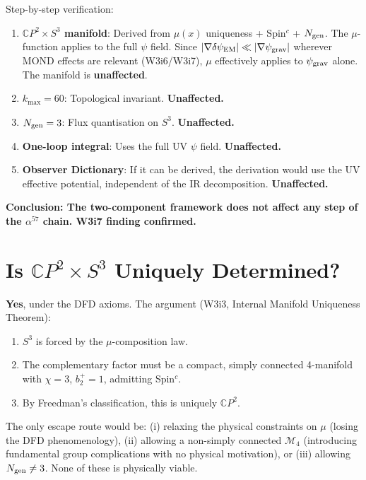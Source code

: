 \documentclass[11pt,a4paper]{article}
\newcommand{\CP}{\mathbb{C}P}
\begin{document}
Step-by-step verification:
\begin{enumerate}[nosep]
\item \textbf{$\CP^2 \times S^3$ manifold}: Derived from $\mu(x)$
  uniqueness + Spin$^c$ + $N_{\rm gen}$. The $\mu$-function applies to
  the full $\psi$ field. Since
  $|\nabla\delta\psi_{\rm EM}| \ll |\nabla\psi_{\rm grav}|$ wherever
  MOND effects are relevant (W3i6/W3i7), $\mu$ effectively applies to
  $\psi_{\rm grav}$ alone. The manifold is \textbf{unaffected}.

\item \textbf{$k_{\max} = 60$}: Topological invariant. \textbf{Unaffected.}

\item \textbf{$N_{\rm gen} = 3$}: Flux quantisation on $S^3$.
  \textbf{Unaffected.}

\item \textbf{One-loop integral}: Uses the full UV $\psi$ field.
  \textbf{Unaffected.}

\item \textbf{Observer Dictionary}: If it can be derived, the
  derivation would use the UV effective potential, independent of the
  IR decomposition. \textbf{Unaffected.}
\end{enumerate}

\textbf{Conclusion: The two-component framework does not affect any
step of the $\alpha^{57}$ chain. W3i7 finding confirmed.}

\section{Is $\CP^2 \times S^3$ Uniquely Determined?}
\label{sec:uniqueness}

\textbf{Yes}, under the DFD axioms. The argument (W3i3, Internal
Manifold Uniqueness Theorem):
\begin{enumerate}[nosep]
\item $S^3$ is forced by the $\mu$-composition law.
\item The complementary factor must be a compact, simply connected
  4-manifold with $\chi = 3$, $b_2^+ = 1$, admitting Spin$^c$.
\item By Freedman's classification, this is uniquely $\CP^2$.
\end{enumerate}

The only escape route would be: (i) relaxing the physical constraints
on $\mu$ (losing the DFD phenomenology), (ii) allowing a non-simply
connected $\mathcal{M}_4$ (introducing fundamental group complications
with no physical motivation), or (iii) allowing $N_{\rm gen} \neq 3$.
None of these is physically viable.
\end{document}
